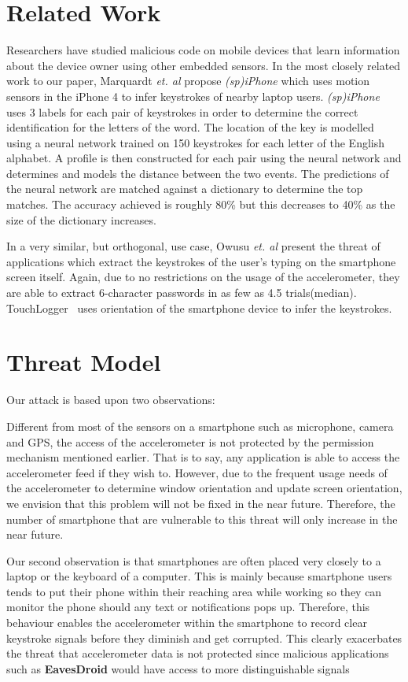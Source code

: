 \documentclass[11pt,conference]{IEEEtran}
\begin{document}
\section{Related Work}
Researchers have studied malicious code on mobile devices that
learn information about the device owner using other embedded sensors.
In the most closely related work to our paper, Marquardt \emph{et. al}
\cite{spiphone} propose \emph{(sp)iPhone} which uses motion sensors in the
iPhone 4
to infer keystrokes of nearby laptop users. \emph{(sp)iPhone} uses 3 labels for
each pair of keystrokes in order to determine the correct identification for
the letters of the word. The location of the key is modelled using a neural
network trained on 150 keystrokes for each letter of the English alphabet.
A profile is then constructed for each pair using the neural network and
determines and models the distance between the two events. The predictions
of the neural network are matched against a dictionary to determine the top
matches. The accuracy achieved is roughly 80\% but this decreases to 40\%
as the size of the dictionary increases.

In a very similar, but orthogonal, use case, Owusu \emph{et. al}
\cite{owusu2012accessory}
present the threat of applications which extract the keystrokes of the
user's typing on the smartphone screen itself. Again, due to no restrictions
on the usage of the accelerometer, they are able to extract 6-character
passwords in as few as 4.5 trials(median). TouchLogger~\cite{cai2011touchlogger}
uses orientation of the smartphone device to infer the keystrokes.

\section{Threat Model}

Our attack is based upon two observations:

Different from most of the sensors on a smartphone such as microphone, camera and GPS, the access of the accelerometer is not protected by the permission mechanism mentioned earlier. That is to say, any application is able to access the accelerometer feed if they wish to. However, due to the frequent usage needs of the accelerometer to determine window orientation and update screen orientation, we envision that this problem will not be fixed in the near future. Therefore, the number of smartphone that are vulnerable to this threat will only increase in the near future.

Our second observation is that smartphones are often placed very closely to a laptop or the keyboard of a computer. This is mainly because smartphone users tends to put their phone within their reaching area while working so they can monitor the phone should any text or notifications pops up. Therefore, this behaviour enables the accelerometer within the smartphone to record clear keystroke signals before they diminish and get corrupted. This clearly exacerbates the threat that accelerometer data is not protected since malicious applications such as \textbf{EavesDroid} would have access to more distinguishable signals
\end{document}
